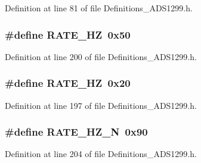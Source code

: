 Definition at line 81 of file Definitions\+\_\+\+A\+D\+S1299.\+h.

\subsubsection[{\texorpdfstring{R\+A\+T\+E\+\_\+100\+HZ}{RATE_100HZ}}]{\setlength{\rightskip}{0pt plus 5cm}\#define R\+A\+T\+E\+\_\+HZ~0x50}\hypertarget{group__Definitions__ADS1299_ga78010f1820cf890267eed537898bb45f}{}\label{group__Definitions__ADS1299_ga78010f1820cf890267eed537898bb45f}


Definition at line 200 of file Definitions\+\_\+\+A\+D\+S1299.\+h.

\subsubsection[{\texorpdfstring{R\+A\+T\+E\+\_\+10\+HZ}{RATE_10HZ}}]{\setlength{\rightskip}{0pt plus 5cm}\#define R\+A\+T\+E\+\_\+HZ~0x20}\hypertarget{group__Definitions__ADS1299_ga0e2e3efa513f8b39538c9c661eeaf418}{}\label{group__Definitions__ADS1299_ga0e2e3efa513f8b39538c9c661eeaf418}


Definition at line 197 of file Definitions\+\_\+\+A\+D\+S1299.\+h.

\subsubsection[{\texorpdfstring{R\+A\+T\+E\+\_\+1250\+H\+Z\+\_\+N}{RATE_1250HZ_N}}]{\setlength{\rightskip}{0pt plus 5cm}\#define R\+A\+T\+E\+\_\+H\+Z\+\_\+N~0x90}\hypertarget{group__Definitions__ADS1299_ga03406f4692c8aeb53586c45156d79288}{}\label{group__Definitions__ADS1299_ga03406f4692c8aeb53586c45156d79288}


Definition at line 204 of file Definitions\+\_\+\+A\+D\+S1299.\+h.

